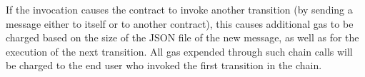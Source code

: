 \documentclass[10pt]{article}
\begin{document}
If the invocation causes the contract to invoke another transition (by
sending a message either to itself or to another contract), this
causes additional gas to be charged based on the size of the JSON file
of the new message, as well as for the execution of the next
transition. All gas expended through such chain calls will be charged
to the end user who invoked the first transition in the chain.


\end{document}
